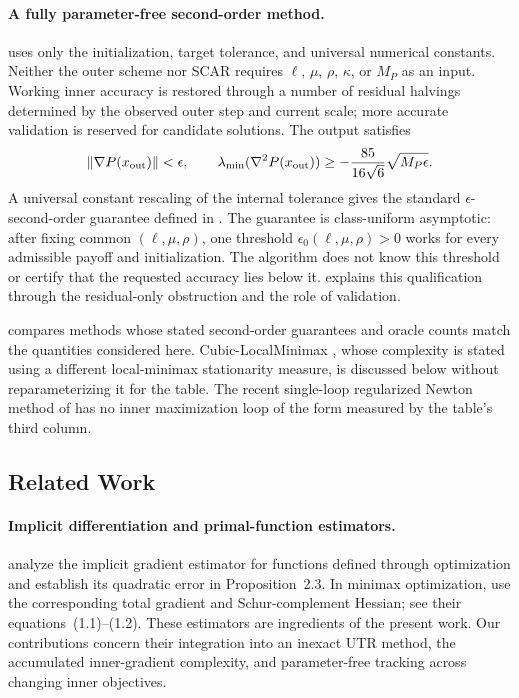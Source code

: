 \documentclass{article}
\begin{document}
\paragraph{A fully parameter-free second-order method.}
 uses only the initialization, target
tolerance, and universal numerical constants. Neither the outer
scheme nor SCAR requires $\ell$, $\mu$, $\rho$, $\kappa$, or $M_P$ as
an input. Working inner accuracy is restored through a number of
residual halvings determined by the observed outer step and current
scale; more accurate validation is reserved for candidate solutions.
The output satisfies
\[
 \|\nabla P(x_{\rm out})\|<\epsilon,\qquad
 \lambda_{\min}(\nabla^2P(x_{\rm out}))
 \ge-\frac{85}{16\sqrt6}\sqrt{M_P\epsilon}.
\]
A universal constant rescaling of the internal tolerance gives the
standard $\epsilon$-second-order guarantee defined in
.
The guarantee is class-uniform asymptotic: after fixing common
$(\ell,\mu,\rho)$, one threshold $\epsilon_0(\ell,\mu,\rho)>0$
works for every admissible payoff and initialization.
The algorithm does not know this threshold or certify that the
requested accuracy lies below it.
 explains this qualification through
the residual-only obstruction and the role of validation.



 compares methods whose stated second-order
guarantees and oracle counts match the quantities considered here.
Cubic-LocalMinimax \citep{chen2023cubic}, whose complexity is stated
using a different local-minimax stationarity measure, is discussed
below without reparameterizing it for the table.
The recent single-loop regularized Newton method of
\citet{ma2026singleloop} has no inner maximization loop of the form
measured by the table's third column.

\subsection{Related Work}
\label{sec:related-work}
\paragraph{Implicit differentiation and primal-function estimators.}
\citet{ablin2020superefficiency} analyze the implicit gradient
estimator for functions defined through optimization and establish
its quadratic error in Proposition~2.3.
In minimax optimization, \citet{zhang2020newton} use the corresponding
total gradient and Schur-complement Hessian; see their
equations~(1.1)--(1.2).
These estimators are ingredients of the present work.
Our contributions concern their integration into an inexact UTR
method, the accumulated inner-gradient complexity, and parameter-free
tracking across changing inner objectives.
\end{document}
